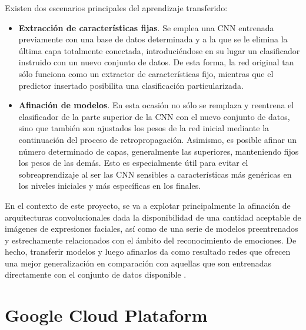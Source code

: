 Existen dos escenarios principales del aprendizaje transferido:
\begin{itemize}
  \item \textbf{Extracción de características fijas}. Se emplea una CNN entrenada previamente con una base de datos determinada y a la que se le elimina la última capa totalmente conectada, introduciéndose en su lugar un clasificador instruido con un nuevo conjunto de datos. De esta forma, la red original tan sólo funciona como un extractor de características fijo, mientras que el predictor insertado posibilita una clasificación particularizada.
  \item \textbf{Afinación de modelos}. En esta ocasión no sólo se remplaza y reentrena el clasificador de la parte superior de la CNN con el nuevo conjunto de datos, sino que también son ajustados los pesos de la red inicial mediante la continuación del proceso de retropropagación. Asimismo, es posible afinar un número determinado de capas, generalmente las superiores, manteniendo fijos los pesos de las demás. Esto es especialmente útil para evitar el sobreaprendizaje al ser las CNN sensibles a características más genéricas en los niveles iniciales y más específicas en los finales.
\end{itemize}

En el contexto de este proyecto, se va a explotar principalmente la afinación de arquitecturas convolucionales dada la disponibilidad de una cantidad aceptable de imágenes de expresiones faciales, así como de una serie de modelos preentrenados y estrechamente relacionados con el ámbito del reconocimiento de emociones. De hecho, transferir modelos y luego afinarlos da como resultado redes que ofrecen una mejor generalización en comparación con aquellas que son entrenadas directamente con el conjunto de datos disponible \cite{TransferLearning}.

\section{Google Cloud Plataform}

